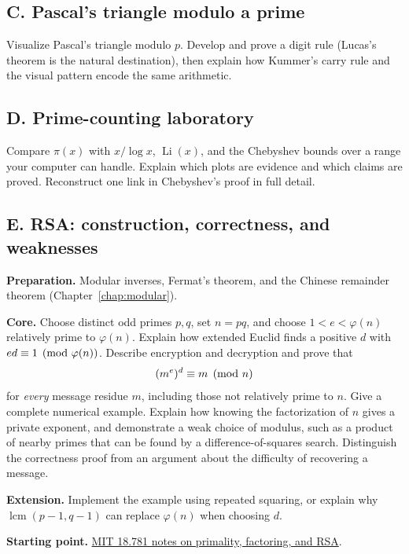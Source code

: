 \subsection*{C. Pascal's triangle modulo a prime}
Visualize Pascal's triangle modulo $p$. Develop and prove a digit rule (Lucas's theorem is the natural destination), then explain how Kummer's carry rule and the visual pattern encode the same arithmetic.

\subsection*{D. Prime-counting laboratory}
Compare $\pi(x)$ with $x/\log x$, $\operatorname{Li}(x)$, and the Chebyshev bounds over a range your computer can handle. Explain which plots are evidence and which claims are proved. Reconstruct one link in Chebyshev's proof in full detail.

\begin{capstoneproject}
\subsection*{E. RSA: construction, correctness, and weaknesses}
\textbf{Preparation.} Modular inverses, Fermat's theorem, and the Chinese
remainder theorem (Chapter~\ref{chap:modular}).

\textbf{Core.} Choose distinct odd primes $p,q$, set $n=pq$, and choose
$1<e<\varphi(n)$ relatively prime to $\varphi(n)$. Explain how extended
Euclid finds a positive $d$ with $ed\equiv1\pmod{\varphi(n)}$.
Describe encryption and decryption
and prove that
\[
  (m^e)^d\equiv m\pmod n
\]
for \emph{every} message residue $m$, including those not relatively prime
to $n$. Give a complete numerical example. Explain how knowing the
factorization of $n$ gives a private exponent, and demonstrate a weak
choice of modulus, such as a product of nearby primes that can be found
by a difference-of-squares search. Distinguish the correctness proof
from an argument about the difficulty of recovering a message.

\textbf{Extension.} Implement the example using repeated squaring, or
explain why $\operatorname{lcm}(p-1,q-1)$ can replace $\varphi(n)$ when
choosing $d$.

\textbf{Starting point.}
\href{https://ocw.mit.edu/courses/18-781-theory-of-numbers-spring-2012/resources/mit18_781s12_lec6/}{MIT 18.781 notes on primality, factoring, and RSA}.

\end{capstoneproject}

